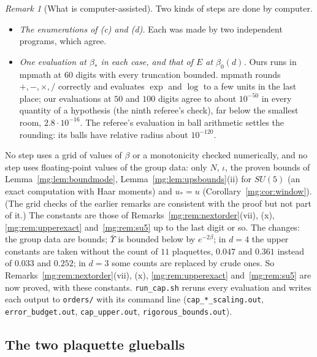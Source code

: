\documentclass[11pt,a4paper]{article}
\theoremstyle{definition}
\theoremstyle{remark}
\newtheorem{remark}[theorem]{Remark}
\begin{document}
\begin{remark}[What is computer-assisted]\label{mg:rem:thirdcap}
Two kinds of steps are done by computer.
\begin{itemize}
\item \emph{The enumerations of (c) and (d).} Each was made by two independent programs, which agree.
\item \emph{One evaluation at $\beta_*$ in each case, and that of $E$ at $\beta_0(d)$.} Ours runs in mpmath at $60$ digits with every truncation bounded. mpmath rounds $+,-,\times,/$ correctly and evaluates
$\exp$ and $\log$ to a few units in the last place; our evaluations at $50$ and $100$ digits agree to about $10^{-50}$ in every quantity of a hypothesis (the ninth referee's check), far below the
smallest room, $2.8\cdot10^{-16}$. The referee's evaluation in ball arithmetic settles the rounding: its balls have relative radius about $10^{-120}$.
\end{itemize}
No step uses a grid of values of $\beta$ or a monotonicity checked numerically, and no step uses floating-point values of the group data: only $N$, $\iota$, the proven bounds of
Lemma~\ref{mg:lem:boundmode}, Lemma~\ref{mg:lem:upsbounds}(ii) for $SU(5)$ (an exact computation with Haar moments) and $u_*=u$ (Corollary~\ref{mg:cor:window}). (The grid checks of the earlier
remarks are consistent with the proof but not part of it.) The constants are those of Remarks~\ref{mg:rem:nextorder}(vii), (x), \ref{mg:rem:upperexact} and~\ref{mg:rem:su5} up to the last digit or
so. The changes: the group data are bounds; $\bar\Upsilon$ is bounded below by $e^{-2\beta}$; in $d=4$ the upper constants are taken without the count of $11$ plaquettes, $0.047$ and $0.361$ instead of
$0.033$ and $0.252$; in $d=3$ some counts are replaced by crude ones. So Remarks~\ref{mg:rem:nextorder}(vii), (x), \ref{mg:rem:upperexact} and~\ref{mg:rem:su5} are now proved, with these constants.
\texttt{run\_cap.sh} reruns every evaluation and writes each output to \texttt{orders/} with its command line (\texttt{cap\_*\_scaling.out}, \texttt{error\_budget.out}, \texttt{cap\_upper.out},
\texttt{rigorous\_bounds.out}).
\end{remark}

\subsection*{The two plaquette glueballs}
\end{document}
